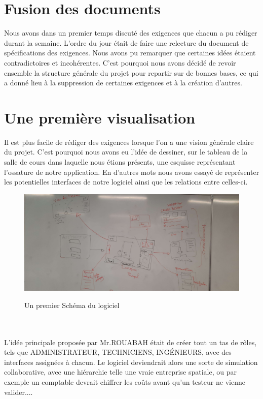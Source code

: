 \documentclass[a4paper, 12pt]{article}
\begin{document}
\section{Fusion des documents}

Nous avons dans un premier temps discuté des exigences que chacun a pu rédiger durant la semaine. L'ordre du jour était de faire une relecture du document de spécifications des exigences. Nous avons pu remarquer que certaines idées étaient contradictoires et incohérentes. C'est pourquoi nous avons décidé de revoir ensemble la structure générale du projet pour repartir sur de bonnes bases, ce qui a donné lieu à la suppression de certaines exigences et à la création d'autres.

\section{Une première visualisation}
Il est plus facile de rédiger des exigences lorsque l'on a une vision générale claire du projet. C'est pourquoi nous avons eu l'idée de dessiner, sur le tableau de la salle de cours dans laquelle nous étions présents, une esquisse représentant l'ossature de notre application. En d'autres mots nous avons essayé de représenter les potentielles interfaces de notre logiciel ainsi que les relations entre celles-ci. 

 \begin{figure}[!h]
    \centering
    \includegraphics[scale=0.1]{schema.jpg}
    \label{fig:Le_planning}
    \caption{Un premier Schéma du logiciel}
\end{figure} 
\\ \\

L'idée principale proposée par Mr.ROUABAH était de créer tout un tas de rôles, tels que ADMINISTRATEUR, TECHNICIENS, INGÉNIEURS, avec des interfaces assignées à chacun. Le logiciel deviendrait alors une sorte de simulation collaborative, avec une hiérarchie telle une vraie entreprise spatiale, ou par exemple un comptable devrait chiffrer les coûts avant qu'un testeur ne vienne valider....
\end{document}
